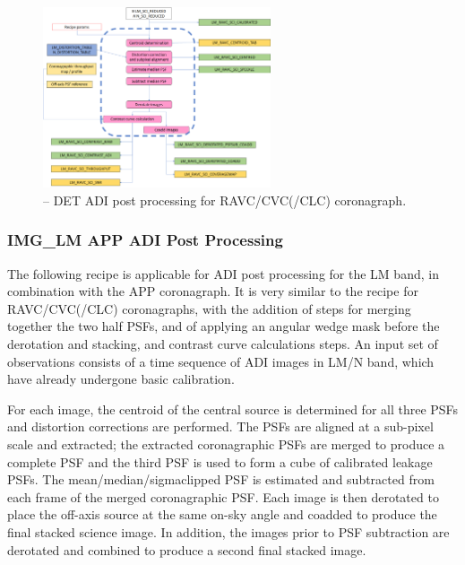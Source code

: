 \begin{figure}[hb]
  \centering
  \includegraphics[width=0.6\textwidth]{./figures/metis_lm_adi_ravc}
  \caption[Recipe: ]{\hyperref[rec:metis_img_adi_cgrph]{} -- DET ADI post processing for RAVC/CVC(/CLC) coronagraph.
    }
  \label{fig:metis_det_adi_ravc}
\end{figure}




\subsubsection{IMG\_LM APP ADI Post Processing}
\label{sssec:adi_img_app}


The following recipe is applicable for ADI post processing for the LM
band, in combination with the APP coronagraph. It is very
similar to the recipe for RAVC/CVC(/CLC) coronagraphs, with the
addition of steps for merging together the two half PSFs, and of
applying an angular wedge mask before the derotation and stacking, and
contrast curve calculations steps. An input set of observations
consists of a time sequence of ADI images in LM/N band, which have
already undergone basic calibration.

For each image, the centroid of the central source is determined for
all three PSFs and distortion corrections are performed. The PSFs are
aligned at a sub-pixel scale and extracted; the extracted
coronagraphic PSFs are merged to produce a complete PSF and the third
PSF is used to form a cube of calibrated leakage PSFs.  The
mean/median/sigmaclipped PSF is estimated and subtracted from each
frame of the merged coronagraphic PSF. Each image is then derotated to
place the off-axis source at the same on-sky angle and coadded to
produce the final stacked science image. In addition, the images prior
to PSF subtraction are derotated and combined to produce a second
final stacked image.

